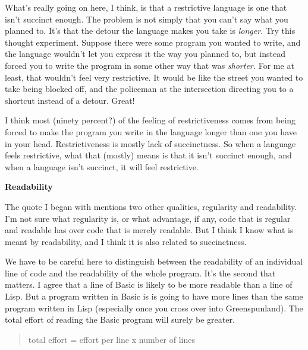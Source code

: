 What's
                  really going on here, I think, is that a restrictive language
                  is one that isn't succinct enough. The problem is not simply
                  that you can't say what you planned to. It's that the detour
                  the language makes you take is \emph{longer.} Try this thought
                  experiment. Suppose there were some program you wanted to
                  write, and the language wouldn't let you express it the way
                  you planned to, but instead forced you to write the program in
                  some other way that was \emph{shorter.} For me at least, that
                  wouldn't feel very restrictive. It would be like the street
                  you wanted to take being blocked off, and the policeman at the
                  intersection directing you to a shortcut instead of a detour.
                  Great!

I think most (ninety percent?) of the
                  feeling of restrictiveness comes from being forced to make the
                  program you write in the language longer than one you have in
                  your head. Restrictiveness is mostly lack of succinctness. So
                  when a language feels restrictive, what that (mostly) means is
                  that it isn't succinct enough, and when a language isn't
                  succinct, it will feel restrictive.

\textbf{Readability}

The quote I began with mentions two other
                  qualities, regularity and readability. I'm not sure what
                  regularity is, or what advantage, if any, code that is regular
                  and readable has over code that is merely readable. But I
                  think I know what is meant by readability, and I think it is
                  also related to succinctness.

We have to be careful
                  here to distinguish between the readability of an individual
                  line of code and the readability of the whole program. It's
                  the second that matters. I agree that a line of Basic is
                  likely to be more readable than a line of Lisp. But a program
                  written in Basic is is going to have more lines than the same
                  program written in Lisp (especially once you cross over into
                  Greenspunland). The total effort of reading the Basic program
                  will surely be greater.
                  \begin{quote}

                    total effort = effort per line x number of lines
                  
\end{quote}

